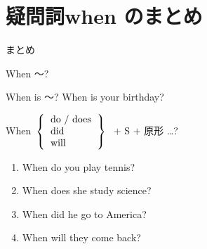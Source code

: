 \documentclass[aspectratio=169,xcolor={dvipsnames,table}]{beamer}
\begin{document}
\section{疑問詞when  のまとめ}
\begin{frame}[plain]{まとめ}
 \begin{block}{When ～? }
\begin{description}[　　　　]
 \item[be動詞] When is ～?%
\hfill{When is your birthday?}\\[20pt]
 \item[一般動詞] When\,\,\,$\left\{ \begin{tabular}{l}
	  do / does\\
	  did\\
	  will\\
	 \end{tabular}\right\}$%
\,\,$+$ S $+$ 原形 \ldots ? 
       \begin{enumerate}
       \item When do you play tennis?
       \item When does she study science?
       \item When did he go to America?
       \item When will they come back?
      \end{enumerate}
\end{description}
  

 \end{block}
\end{frame}
\end{document}
